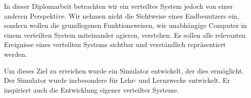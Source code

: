 In dieser Diplomarbeit betrachten wir ein verteiltes System jedoch von einer anderen Perspektive. Wir nehmen nicht die Sichtweise eines Endbenutzers ein, sondern wollen die grundlegenen Funktionsweisen, wie unabh\"{a}ngige Computer in einem verteilten System miteinander agieren, verstehen. Es sollen alle relevanten Ereignisse eines verteilten Systems sichtbar und verst\"{a}ndlich repr\"{a}sentiert werden.

Um dieses Ziel zu erreichen wurde ein Simulator entwickelt, der dies erm\"{o}glicht. Der Simulator wurde insbesondere f\"{u}r Lehr- und Lernzwecke entwickelt. Er inspiriert auch die Entwicklung eigener verteilter Systeme.

